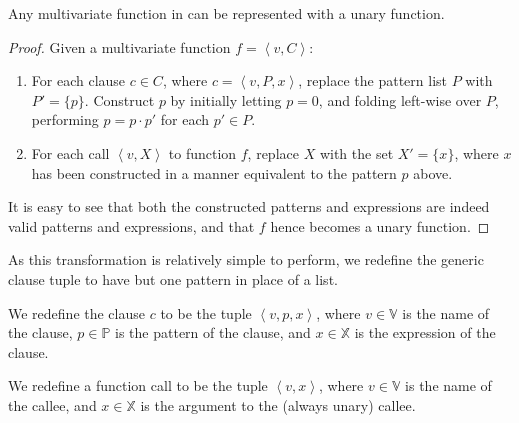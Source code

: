 \begin{theorem}\label{theorem:multivariate-to-unary} Any multivariate function
in \D{} can be represented with a unary function.\end{theorem}

\begin{proof}

Given a multivariate function $f= \left\langle v,C \right\rangle$:

\begin{enumerate}

\item For each clause $c\in C$, where $c=\left\langle v,P,x \right\rangle$,
replace the pattern list $P$ with $P'=\{p\}$. Construct $p$ by initially
letting $p=0$, and folding left-wise over $P$, performing $p=p\cdot p'$ for
each $p'\in P$. 

\item For each call $\left\langle v, X\right\rangle$ to function $f$, replace
$X$ with the set $X'=\{x\}$, where $x$ has been constructed in a manner
equivalent to the pattern $p$ above.

\end{enumerate}

It is easy to see that both the constructed patterns and expressions are indeed
valid patterns and expressions, and that $f$ hence becomes a unary
function.\end{proof}

As this transformation is relatively simple to perform, we redefine the generic
clause tuple to have but one pattern in place of a list. 

\begin{definition}\label{definition:unary-clause} We redefine the clause $c$ to
be the tuple $\left\langle v,p,x\right\rangle$, where $v\in\mathbb{V}$ is the
name of the clause, $p\in\mathbb{P}$ is the pattern of the clause, and
$x\in\mathbb{X}$ is the expression of the clause.\end{definition}

\begin{definition}\label{definition:unary-function-call} We redefine a function
call to be the tuple $\left\langle v,x\right\rangle$, where $v\in\mathbb{V}$ is
the name of the callee, and $x\in\mathbb{X}$ is the argument to the (always
unary) callee.\end{definition}

